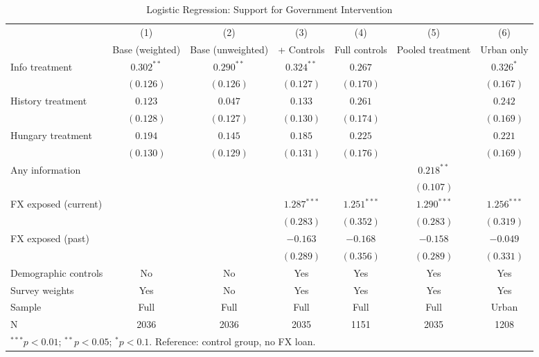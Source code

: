 \begin{table}[htbp]
\centering
\caption{Logistic Regression: Support for Government Intervention}
\label{tab:robustness}
\small
\begin{tabular}{lcccccc}
\toprule
 & (1) & (2) & (3) & (4) & (5) & (6) \\
 & \scriptsize Base (weighted) & \scriptsize Base (unweighted) & \scriptsize + Controls & \scriptsize Full controls & \scriptsize Pooled treatment & \scriptsize Urban only \\
\midrule
Info treatment & $0.302^{**}$ & $0.290^{**}$ & $0.324^{**}$ & $0.267$ &  & $0.326^{*}$ \\
 & $(0.126)$ & $(0.126)$ & $(0.127)$ & $(0.170)$ &  & $(0.167)$ \\[0.3em]
History treatment & $0.123$ & $0.047$ & $0.133$ & $0.261$ &  & $0.242$ \\
 & $(0.128)$ & $(0.127)$ & $(0.130)$ & $(0.174)$ &  & $(0.169)$ \\[0.3em]
Hungary treatment & $0.194$ & $0.145$ & $0.185$ & $0.225$ &  & $0.221$ \\
 & $(0.130)$ & $(0.129)$ & $(0.131)$ & $(0.176)$ &  & $(0.169)$ \\[0.3em]
Any information &  &  &  &  & $0.218^{**}$ &  \\
 &  &  &  &  & $(0.107)$ &  \\[0.3em]
FX exposed (current) &  &  & $1.287^{***}$ & $1.251^{***}$ & $1.290^{***}$ & $1.256^{***}$ \\
 &  &  & $(0.283)$ & $(0.352)$ & $(0.283)$ & $(0.319)$ \\[0.3em]
FX exposed (past) &  &  & $-0.163$ & $-0.168$ & $-0.158$ & $-0.049$ \\
 &  &  & $(0.289)$ & $(0.356)$ & $(0.289)$ & $(0.331)$ \\[0.3em]
\midrule
Demographic controls & No & No & Yes & Yes & Yes & Yes \\
Survey weights & Yes & No & Yes & Yes & Yes & Yes \\
Sample & Full & Full & Full & Full & Full & Urban \\
N & 2036 & 2036 & 2035 & 1151 & 2035 & 1208 \\
\bottomrule
\multicolumn{7}{l}{\scriptsize $^{***}p<0.01$; $^{**}p<0.05$; $^{*}p<0.1$. Reference: control group, no FX loan.} \\
\end{tabular}
\end{table}